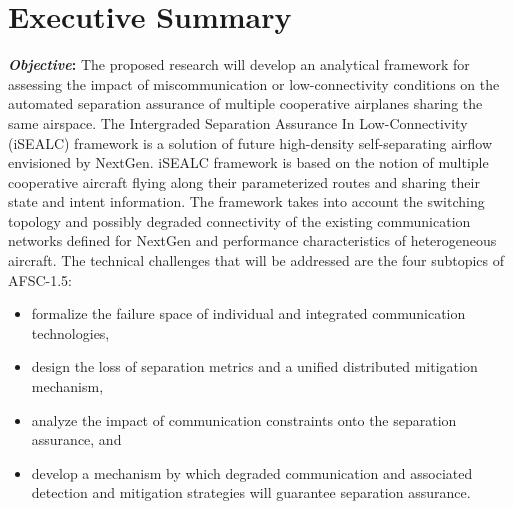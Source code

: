 \documentclass[letter,onecolumn,12pt]{aiaa-tc}
\newcommand{\1}{1_n}
\begin{document}
\pagestyle{empty}
\section*{Executive Summary}  %

\textbf{\emph{Objective}:} The proposed research will develop an analytical framework for assessing the impact of miscommunication or low-connectivity conditions on the automated separation assurance of multiple cooperative airplanes sharing the same airspace. The Intergraded Separation Assurance In Low-Connectivity (iSEALC) framework is a solution of future high-density self-separating airflow envisioned by NextGen. iSEALC framework is based on the notion of  multiple cooperative aircraft flying along their parameterized routes and sharing their state and intent information. The framework takes into account the switching topology and possibly degraded connectivity of the existing communication networks defined for NextGen and performance characteristics of heterogeneous aircraft.
The technical challenges that will be addressed are the four subtopics of AFSC-1.5:
\vspace{-2mm}
\begin{itemize}
\setlength{\itemsep}{-4pt}
    \item formalize the failure space of individual and integrated communication technologies,
    \item design the loss of separation metrics and a unified distributed mitigation mechanism,
    \item analyze the impact of  communication constraints onto the separation assurance, and
    \item develop a mechanism by which degraded communication and associated detection and mitigation strategies will guarantee separation assurance.
\end{itemize}
\end{document}

